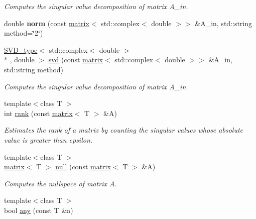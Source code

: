 \begin{DoxyCompactItemize}
\begin{DoxyCompactList}\small\item\em Computes the singular value decomposition of matrix A\-\_\-in. \end{DoxyCompactList}\item 
\hypertarget{namespacekeycpp_ad211ab5ae14ac9710265c662f70f20ff}{double {\bfseries norm} (const \hyperlink{classkeycpp_1_1matrix}{matrix}$<$ std\-::complex$<$ double $>$$>$ \&A\-\_\-in, std\-::string method=\char`\"{}2\char`\"{})}\label{namespacekeycpp_ad211ab5ae14ac9710265c662f70f20ff}

\item 
\hypertarget{namespacekeycpp_ad610adca37ac4c85df23b899d29d5dfc}{\hyperlink{classkeycpp_1_1_s_v_d__type}{S\-V\-D\-\_\-type}$<$ std\-::complex$<$ double $>$\\*
, double $>$ \hyperlink{namespacekeycpp_ad610adca37ac4c85df23b899d29d5dfc}{svd} (const \hyperlink{classkeycpp_1_1matrix}{matrix}$<$ std\-::complex$<$ double $>$$>$ \&A\-\_\-in, std\-::string method)}\label{namespacekeycpp_ad610adca37ac4c85df23b899d29d5dfc}

\begin{DoxyCompactList}\small\item\em Computes the singular value decomposition of matrix A\-\_\-in. \end{DoxyCompactList}\item 
\hypertarget{namespacekeycpp_aeb9efbc77cc58fa22403ea7ae5f4555c}{{\footnotesize template$<$class T $>$ }\\int \hyperlink{namespacekeycpp_aeb9efbc77cc58fa22403ea7ae5f4555c}{rank} (const \hyperlink{classkeycpp_1_1matrix}{matrix}$<$ T $>$ \&A)}\label{namespacekeycpp_aeb9efbc77cc58fa22403ea7ae5f4555c}

\begin{DoxyCompactList}\small\item\em Estimates the rank of a matrix by counting the singular values whose absolute value is greater than epsilon. \end{DoxyCompactList}\item 
\hypertarget{namespacekeycpp_a8f497e2da901adba0e1257be943595a1}{{\footnotesize template$<$class T $>$ }\\\hyperlink{classkeycpp_1_1matrix}{matrix}$<$ T $>$ \hyperlink{namespacekeycpp_a8f497e2da901adba0e1257be943595a1}{null} (const \hyperlink{classkeycpp_1_1matrix}{matrix}$<$ T $>$ \&A)}\label{namespacekeycpp_a8f497e2da901adba0e1257be943595a1}

\begin{DoxyCompactList}\small\item\em Computes the nullspace of matrix A. \end{DoxyCompactList}\item 
\hypertarget{namespacekeycpp_a70b89ab3e8f66f86c47c3bde004d4487}{{\footnotesize template$<$class T $>$ }\\bool \hyperlink{namespacekeycpp_a70b89ab3e8f66f86c47c3bde004d4487}{any} (const T \&a)}\label{namespacekeycpp_a70b89ab3e8f66f86c47c3bde004d4487}


\end{DoxyCompactItemize}
